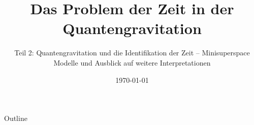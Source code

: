 \documentclass[mathserif]{beamer}
\title{\textbf{Das Problem der Zeit in der Quantengravitation}}
\author{\small {Teil 2: Quantengravitation und die Identifikation der Zeit -- Minisuperspace Modelle und Ausblick auf weitere Interpretationen}}
\institute{}
\date{\today}
\theoremstyle{definition}
\begin{document}
	\begin{frame}
		\titlepage
	\end{frame}

	\begin{frame}{Outline}
		\tableofcontents
	\end{frame}
\end{document}
